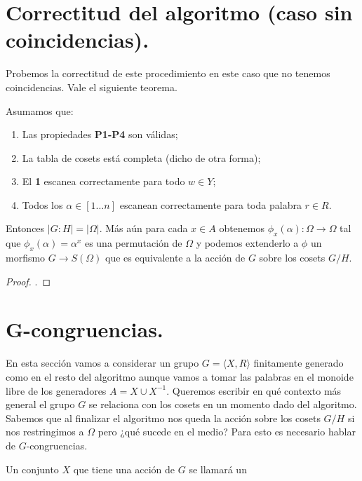 \documentclass[tesis.tex]{subfiles}
\newcommand{\In}{[1 \dots n]}
\begin{document}
\section{Correctitud del algoritmo (caso sin coincidencias).}

Probemos la correctitud de este procedimiento en este caso que no tenemos coincidencias.
Vale el siguiente teorema.
\begin{teo}
	Asumamos que:
	\begin{enumerate}
		\item Las propiedades \textbf{P1-P4} son válidas;
		\item La tabla de cosets está completa (dicho de otra forma);
		\item El \textbf{1} escanea correctamente para todo $w \in Y$;
		\item Todos los $\alpha \in \In$ escanean correctamente para toda palabra $r \in R$.
	\end{enumerate}
	Entonces $|G:H| = |\Omega|$.
	Más aún para cada $x \in A$ obtenemos $\phi_x(\alpha) : \Omega \to \Omega$ tal que $\phi_x(\alpha) = \alpha^x$ es una permutación de $\Omega$ y podemos extenderlo a $\phi$ un morfismo $G \to S(\Omega)$ que es equivalente a la acción de $G$ sobre los cosets $G/H$.
\end{teo}
\begin{proof}
	.
\end{proof}





\section{G-congruencias.}
En esta sección vamos a considerar un grupo $G = \langle X, R \rangle$ finitamente generado como en el resto del algoritmo aunque vamos a tomar las palabras en el monoide libre de los generadores $A = X \cup X^{-1}$.
Queremos escribir en qué contexto más general el grupo $G$ se relaciona con los cosets en un momento dado del algoritmo. 
Sabemos que al finalizar el algoritmo nos queda la acción sobre los cosets $G/H$ si nos restringimos a $\Omega$ pero ¿qué sucede en el medio?
Para esto es necesario hablar de $G$-congruencias.
\begin{deff}
    Un conjunto $X$ que tiene una acción de $G$ se llamará un 
\end{deff}

\end{document}
